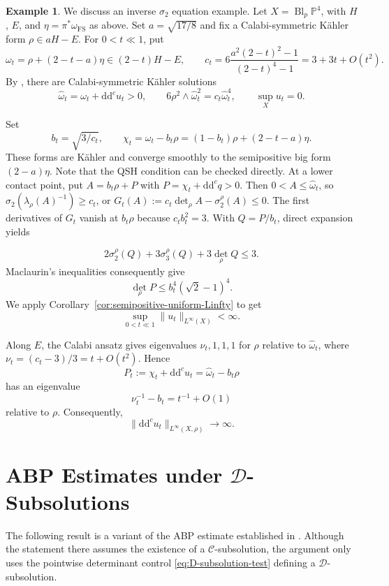 \documentclass[oneside,english,letterpaper]{amsart}
\numberwithin{equation}{section}
\theoremstyle{plain}
\theoremstyle{definition}
\newtheorem{example}[thm]{Example}
\theoremstyle{remark}
\renewcommand{\d}{\mathrm{d}}
\newcommand{\ddc}{\d\d^c}
\begin{document}
\begin{example}
\label{ex:inverse-sigma2-degeneration}
We discuss an inverse $\sigma_2$ equation example. Let $X=\operatorname{Bl}_p\mathbb P^4$, with $H$, $E$, and
$\eta=\pi^*\omega_{\mathrm{FS}}$ as above. Set $a=\sqrt{17/8}$
and fix a Calabi-symmetric K\"ahler form $\rho\in aH-E$.
For $0<t\ll1$, put
$$
\omega_t=\rho+(2-t-a)\eta\in(2-t)H-E,
\qquad
c_t=6\frac{a^2(2-t)^2-1}{(2-t)^4-1}
=3+3t+O(t^2).
$$
By \cite[Theorem~1.2]{MR3105762}, there are Calabi-symmetric
K\"ahler solutions
\begin{equation}\label{inversesigma2}
    \widehat\omega_t=\omega_t+\ddc u_t>0,\qquad
6\rho^2\wedge\widehat\omega_t^2=c_t\widehat\omega_t^4,
\qquad \sup_Xu_t=0.
\end{equation}

Set
$$
b_t=\sqrt{3/c_t},\qquad
\chi_t=\omega_t-b_t\rho
=(1-b_t)\rho+(2-t-a)\eta.
$$
These forms are K\"ahler and converge smoothly to the semipositive
big form $(2-a)\eta$. Note that the QSH condition can be checked directly.
At a lower contact point, put $A=b_t\rho+P$ with
$P=\chi_t+\ddc q>0$. Then $0<A\leq\widehat\omega_t$, so
$\sigma_2(\lambda_\rho(A)^{-1})\geq c_t$, or
$G_t(A):=c_t\det_\rho A-\sigma_2^\rho(A)\leq0$.
The first derivatives of $G_t$ vanish at $b_t\rho$ because
$c_tb_t^2=3$. With $Q=P/b_t$, direct expansion yields

$$
2\sigma_2^\rho(Q)+3\sigma_3^\rho(Q)+3\det_\rho Q\leq3.
$$
Maclaurin's inequalities consequently give
$$
\det_\rho P\leq b_t^4(\sqrt2-1)^4.
$$ We apply Corollary~\ref{cor:semipositive-uniform-Linfty}
to get
$$
\sup_{0<t\ll1}\|u_t\|_{L^\infty(X)}<\infty.
$$

Along $E$, the Calabi ansatz gives eigenvalues
$\nu_t,1,1,1$ for $\rho$ relative to $\widehat\omega_t$, where
$\nu_t=(c_t-3)/3=t+O(t^2)$. Hence
$$
P_t:=\chi_t+\ddc u_t=\widehat\omega_t-b_t\rho
$$
has an eigenvalue
\[
\nu_t^{-1}-b_t=t^{-1}+O(1)
\]
relative to $\rho$.
Consequently,
$$
\|\ddc u_t\|_{L^\infty(X,\rho)}\longrightarrow\infty.
$$
\end{example}

\appendix
\section{ABP Estimates under \texorpdfstring{$\mathcal D$}{D}-Subsolutions}
\label{ABP}
The following result is a variant of the ABP estimate established in \cite[Proposition 11]{MR3807322}. Although the statement there assumes the existence of a $\mathcal C$-subsolution, the argument only uses the pointwise determinant control \eqref{eq:D-subsolution-test} defining a $\mathcal D$-subsolution.
\end{document}
